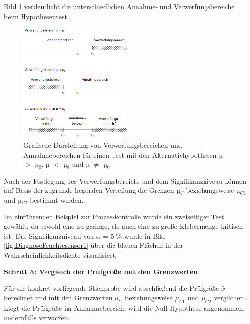 \noindent Bild \ref{fig:AnnahmeUndVerwerfungsbereiche} verdeutlicht die unterschiedlichen Annahme- und Verwerfungsbereiche beim Hypothesentest.

\clearpage

\noindent 
\begin{figure}[H]
  \centerline{\includegraphics[width=0.5\textwidth]{Kapitel6/Bilder/image2}}
  \caption{Grafische Darstellung von Verwerfungsbereichen und Annahmebereichen f\"{u}r einen Test mit den Alternativhypothesen µ $\mathrm{>}$ µ$_{0}$, µ $\mathrm{<}$ µ$_{0}$ und µ $\neq$ µ$_{0}$}
  \label{fig:AnnahmeUndVerwerfungsbereiche}
\end{figure}

\noindent Nach der Festlegung des Verwerfungsbereichs und dem Signifikanzniveau k\"{o}nnen auf Basis der zugrunde liegenden Verteilung die Grenzen µ$_{C}$ beziehungsweise µ$_{C1}$ und µ$_{C2}$ bestimmt werden.\newline

\noindent Im einf\"{u}hrenden Beispiel zur Prozesskontrolle wurde ein zweiseitiger Test gew\"{a}hlt, da sowohl eine zu geringe, als auch eine zu gro{\ss}e Klebermenge kritisch ist. Das Signifikanzniveau von $\alpha$ = 5 \% wurde in Bild \ref{fig:DiagnoseFeuchtesensor1} \"{u}ber die blauen Fl\"{a}chen in der Wahrscheinlichkeitsdichte visualisiert.

\clearpage 

{\selectfont
\noindent\textbf{Schritt 5: Vergleich der Pr\"{u}fgr\"{o}{\ss}e mit den Grenzwerten}}\smallskip

\noindent F\"{u}r die konkret vorliegende Stichprobe wird abschlie{\ss}end die Pr\"{u}fgr\"{o}{\ss}e $\bar{x}$ berechnet und mit den Grenzwerten $\mu_{C}$ beziehungsweise $\mu_{C1}$ und $\mu_{C2}$ verglichen. Liegt die Pr\"{u}fgr\"{o}{\ss}e im Annahmebereich, wird die Null-Hypothese angenommen, andernfalls verworfen. \newline

